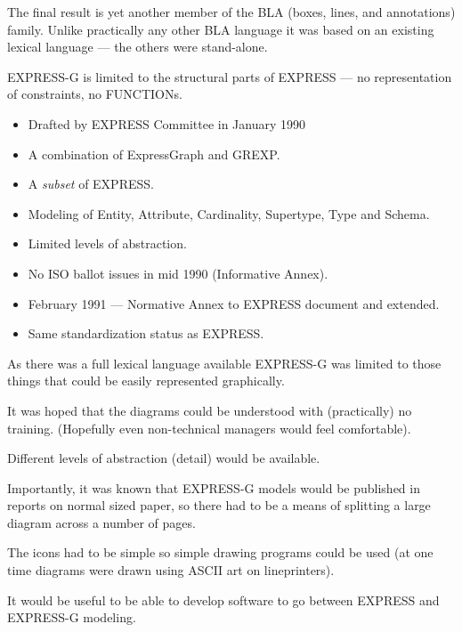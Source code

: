 \begin{remarks}
\remintro
{}

    The final result is yet another member of the BLA (boxes,
lines, and annotations) family. Unlike practically any other BLA
language it was based on an existing lexical language --- the others
were stand-alone.

    EXPRESS-G is limited to the structural parts of EXPRESS --- no
representation of constraints, no FUNCTIONs.

\remend
\end{remarks}



\begin{itemize}
\item Drafted by EXPRESS Committee in January 1990
\item A combination of ExpressGraph and GREXP.
\item A \emph{subset} of EXPRESS.
\item Modeling of Entity, Attribute, Cardinality, Supertype, Type and Schema.
\item Limited levels of abstraction.
\item No ISO ballot issues in mid 1990 (Informative Annex).
\item February 1991 --- Normative Annex to EXPRESS document and
extended.
\item Same standardization status as EXPRESS.
\end{itemize}

\begin{remarks}
\remintro
{}

    As there was a full lexical language available EXPRESS-G was limited
to those things that could be easily represented graphically.

    It was hoped that the diagrams could be understood with (practically)
no training. (Hopefully even non-technical managers would feel comfortable).

    Different levels of abstraction (detail) would be available.

    Importantly, it was known that EXPRESS-G models would be published
in reports on normal sized paper, so there had to be a means of splitting 
a large diagram across a number of pages.

    The icons had to be simple so simple drawing programs could be used
(at one time diagrams were drawn using ASCII art on lineprinters).

    It would be useful to be able to develop software to go between
EXPRESS and EXPRESS-G modeling.
    

\remend
\end{remarks}

